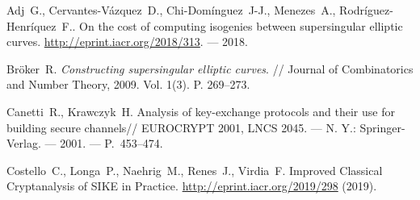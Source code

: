 \documentclass[a4paper,12pt]{article}
\theoremstyle{definition}
\renewcommand{\baselinestretch}{1.35}
\begin{document}
  \renewcommand{\baselinestretch}{.9}\large
\newcommand{\noopsort}[1]{} \newcommand{\printfirst}[2]{#1}
  \newcommand{\singleletter}[1]{#1} \newcommand{\switchargs}[2]{#2#1}
\begin{thebibliography}{1}













 Adj~G., Cervantes-Vázquez~D., Chi-Domínguez~J-J.,  Menezes~A., Rodríguez-Henríquez~F.. On the cost of computing isogenies between supersingular elliptic curves.  \url{http://eprint.iacr.org/2018/313}. --- 2018.


 Bröker~R. {\it Constructing supersingular elliptic curves}. // Journal of Combinatorics and Number Theory, 2009. Vol. 1(3). P. 269--273.

Canetti~R., Krawczyk~H.
\newblock
\newblock Analysis of key-exchange protocols and their use for building secure
 channels// EUROCRYPT 2001, LNCS 2045.
\newblock --- N. Y.: Springer-Verlag.
\newblock --- 2001.
\newblock ---  P.~453--474.

 Costello~C., Longa~P., Naehrig~M., Renes~J., Virdia~F. Improved Classical Cryptanalysis of SIKE in Practice. \url{http://eprint.iacr.org/2019/298} (2019).


\end{thebibliography}
\end{document}
